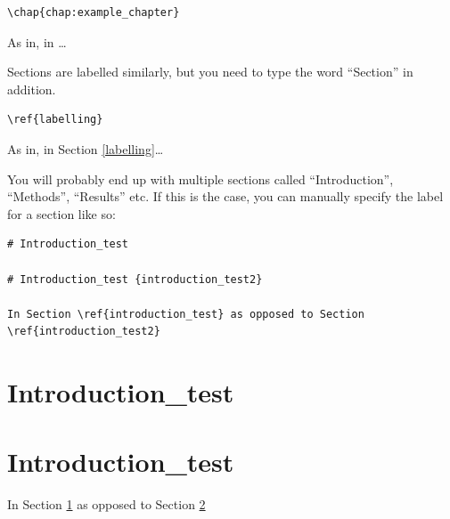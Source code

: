 \documentclass[../main.tex]{subfiles}
\begin{document}
\begin{verbatim}
\chap{chap:example_chapter}
\end{verbatim}

As in, in \ldots{}

Sections are labelled similarly, but you need to type the word
``Section'' in addition.

\begin{verbatim}
\ref{labelling}
\end{verbatim}

As in, in Section \ref{labelling}\ldots{}

You will probably end up with multiple sections called ``Introduction'',
``Methods'', ``Results'' etc. If this is the case, you can manually
specify the label for a section like so:

\begin{verbatim}
# Introduction_test 

# Introduction_test {introduction_test2}

In Section \ref{introduction_test} as opposed to Section \ref{introduction_test2}
\end{verbatim}

\hypertarget{introduction_test}{%
\section{Introduction\_test}\label{introduction_test}}

\hypertarget{introduction_test2}{%
\section{Introduction\_test}\label{introduction_test2}}

In Section \ref{introduction_test} as opposed to Section
\ref{introduction_test2}
\end{document}
